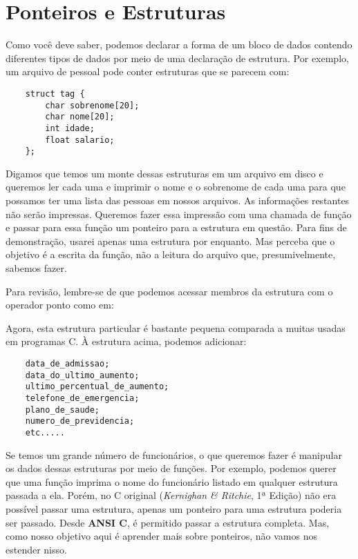 
\chapter{Ponteiros e Estruturas}
Como você deve saber, podemos declarar a forma de um bloco de dados contendo diferentes tipos de dados por meio de uma declaração de estrutura. Por exemplo, um arquivo de pessoal pode conter estruturas que se parecem com:
\begin{lstlisting}
	struct tag {
		char sobrenome[20];
		char nome[20];
		int idade;
		float salario;
	};
\end{lstlisting}

Digamos que temos um monte dessas estruturas em um arquivo em disco e queremos ler cada uma e imprimir o nome e o sobrenome de cada uma para que possamos ter uma lista das pessoas em nossos arquivos. As informações restantes não serão impressas. Queremos fazer essa impressão com uma chamada de função e passar para essa função um ponteiro para a estrutura em questão. Para fins de demonstração, usarei apenas uma estrutura por enquanto. Mas perceba que o objetivo é a escrita da função, não a leitura do arquivo que, presumivelmente, sabemos fazer.

Para revisão, lembre-se de que podemos acessar membros da estrutura com o operador ponto como em:


Agora, esta estrutura particular é bastante pequena comparada a muitas usadas em programas C. À estrutura acima, podemos adicionar:
\begin{lstlisting}
	data_de_admissao;
	data_do_ultimo_aumento;
	ultimo_percentual_de_aumento;
	telefone_de_emergencia;
	plano_de_saude;
	numero_de_previdencia;
	etc.....
\end{lstlisting}

Se temos um grande número de funcionários, o que queremos fazer é manipular os dados dessas estruturas por meio de funções. Por exemplo, podemos querer que uma função imprima o nome do funcionário listado em qualquer estrutura passada a ela. Porém, no C original (\textit{Kernighan \& Ritchie}, 1ª Edição) não era possível passar uma estrutura, apenas um ponteiro para uma estrutura poderia ser passado. Desde \textbf{ANSI C}, é permitido passar a estrutura completa. Mas, como nosso objetivo aqui é aprender mais sobre ponteiros, não vamos nos estender nisso.

